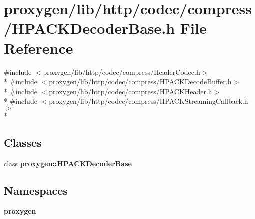 \section{proxygen/lib/http/codec/compress/\+H\+P\+A\+C\+K\+Decoder\+Base.h File Reference}
\label{HPACKDecoderBase_8h}
{\ttfamily \#include $<$proxygen/lib/http/codec/compress/\+Header\+Codec.\+h$>$}\\*
{\ttfamily \#include $<$proxygen/lib/http/codec/compress/\+H\+P\+A\+C\+K\+Decode\+Buffer.\+h$>$}\\*
{\ttfamily \#include $<$proxygen/lib/http/codec/compress/\+H\+P\+A\+C\+K\+Header.\+h$>$}\\*
{\ttfamily \#include $<$proxygen/lib/http/codec/compress/\+H\+P\+A\+C\+K\+Streaming\+Callback.\+h$>$}\\*
\subsection*{Classes}
\begin{DoxyCompactItemize}
\item 
class {\bf proxygen\+::\+H\+P\+A\+C\+K\+Decoder\+Base}
\end{DoxyCompactItemize}
\subsection*{Namespaces}
\begin{DoxyCompactItemize}
\item 
 {\bf proxygen}
\end{DoxyCompactItemize}
